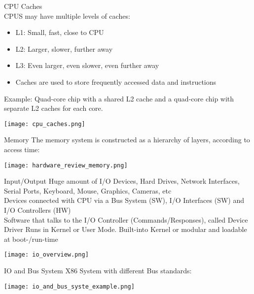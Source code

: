 \begin{theorem}{CPU Caches}\\
    CPUS may have multiple levels of caches:
    \begin{itemize}
        \item L1: Small, fast, close to CPU
        \item L2: Larger, slower, further away
        \item L3: Even larger, even slower, even further away
        \item Caches are used to store frequently accessed data and instructions
    \end{itemize}
    
    Example: Quad-core chip with a shared L2 cache and a quad-core chip with separate L2 caches for each core.
    
    \texttt{[image: cpu\_caches.png]}
\end{theorem}

\begin{definition}{Memory}
    The memory system is constructed as a hierarchy of layers, according to access time:

    \texttt{[image: hardware\_review\_memory.png]}
\end{definition}

\begin{concept}{Input/Output}
    Huge amount of I/O Devices, Hard Drives, Network Interfaces, Serial Ports,
    Keyboard, Mouse, Graphics, Cameras, etc
    \vspace{2mm}\\
    Devices connected with CPU via a Bus System (SW), I/O Interfaces (SW) and I/O
    Controllers (HW)
    \vspace{2mm}\\
    Software that talks to the I/O Controller (Commands/Responses), called Device Driver
    Runs in Kernel or User Mode.
    Built-into Kernel or modular and loadable at boot-/run-time

    \texttt{[image: io\_overview.png]}
\end{concept}

\begin{example2}{IO and Bus System} X86 System with different Bus standards:

    \texttt{[image: io\_and\_bus\_syste\_example.png]}
\end{example2}


